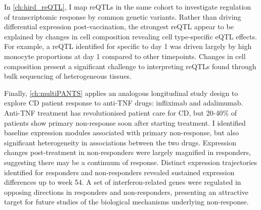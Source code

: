 In \cref{ch:hird_reQTL}, I map \glspl{reQTL} in the same cohort to investigate regulation of transcriptomic response by common genetic variants.
Rather than driving differential expression post-vaccination,
the strongest \gls{reQTL} appear to be explained by changes in cell composition revealing cell type-specific \gls{eQTL} effects.
For example, a \gls{reQTL} identified for  specific to day 1 was driven largely by high monocyte proportions at day 1 compared to other timepoints.
Changes in cell composition present a significant challenge to interpreting \glspl{reQTL} found through bulk sequencing of heterogeneous tissues.

Finally, \cref{ch:multiPANTS} applies an analogous longitudinal study design to explore \gls{CD} patient response to anti-\gls{TNF} drugs: infliximab and adalimumab.
Anti-\gls{TNF} treatment has revolutionised patient care for \gls{CD},
but 20-40\% of patients show primary non-response soon after starting treatment.
I identified baseline expression modules associated with primary non-response, but also significant heterogeneity in associations between the two drugs.
Expression changes post-treatment in non-responders were largely magnified in responders, suggesting there may be a continuum of response.
Distinct expression trajectories identified for responders and non-responders revealed sustained expression differences up to week 54.
A set of interferon-related genes were regulated in opposing directions in responders and non-responders,
presenting an attractive target for future studies of the biological mechanisms underlying non-response.

